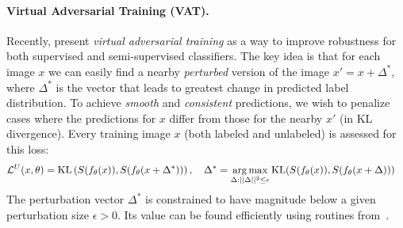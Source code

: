 

\paragraph{Virtual Adversarial Training (VAT).}
Recently, \citet{miyatoVirtualAdversarialTraining2019} present \emph{virtual adversarial training} as a way to improve robustness for both supervised and semi-supervised classifiers.
The key idea is that for each image $x$ we can easily find a nearby \emph{perturbed} version of the image $x' = x + \Delta^*$, where $\Delta^*$ is the vector that leads to greatest change in predicted label distribution.
To achieve \emph{smooth} and \emph{consistent} predictions, we wish to penalize cases where the predictions for $x$ differ from those for the nearby $x'$ (in KL divergence).
Every training image $x$ (both labeled and unlabeled) is assessed for this loss:
\begin{align*}
\mathcal{L}^U(x, \theta) &= 
    	\text{KL}\left( S(f_{\theta}(x)), S(f_{\theta}(x + \Delta^*)) \right),
\quad 
\Delta^* = \operatorname*{arg\,max}_{\Delta : || \Delta ||^2 \leq \epsilon }
	\text{KL}( S(f_{\theta}(x)), S(f_{\theta}(x+\Delta)))
\end{align*}
The perturbation vector $\Delta^*$ is constrained to have magnitude below a given perturbation size $\epsilon > 0$. Its value can be found efficiently using routines from~\citet{miyatoVirtualAdversarialTraining2019}.

